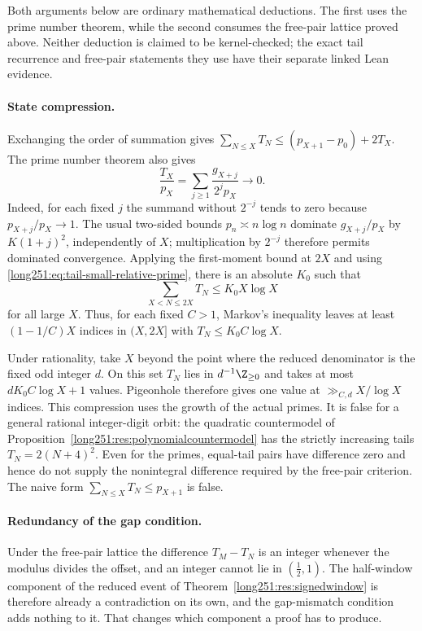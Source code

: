 \documentclass[11pt]{article}
\begin{document}
Both arguments below are ordinary mathematical deductions.  The first uses
the prime number theorem, while the second consumes the free-pair lattice
proved above.  Neither deduction is claimed to be kernel-checked; the exact
tail recurrence and free-pair statements they use have their separate linked
Lean evidence.

\paragraph{State compression.}  Exchanging the order of summation gives
$\sum_{N\le X}T_N\le(p_{X+1}-p_0)+2T_X$.  The prime number theorem
\cite[Ch.~6]{mv2007} also gives
\begin{equation}\label{long251:eq:tail-small-relative-prime}
 \frac{T_X}{p_X}
 =\sum_{j\ge1}\frac{g_{X+j}}{2^jp_X}\longrightarrow0.
\end{equation}
Indeed, for each fixed $j$ the summand without $2^{-j}$ tends to zero because
$p_{X+j}/p_X\to1$.  The usual two-sided bounds $p_n\asymp n\log n$ dominate
$g_{X+j}/p_X$ by $K(1+j)^2$, independently of $X$; multiplication by $2^{-j}$
therefore permits dominated convergence.  Applying the first-moment bound at
$2X$ and using \eqref{long251:eq:tail-small-relative-prime}, there is an absolute
$K_0$ such that
\[
 \sum_{X<N\le2X}T_N\le K_0X\log X
\]
for all large $X$.  Thus, for each fixed $C>1$, Markov's inequality leaves at
least $(1-1/C)X$ indices in $(X,2X]$ with $T_N\le K_0C\log X$.

Under rationality, take $X$ beyond the point where the reduced denominator is
the fixed odd integer $d$.  On this set $T_N$ lies in $d^{-1}\Z_{\ge0}$ and
takes at most $dK_0C\log X+1$ values.  Pigeonhole therefore gives one value at
$\gg_{C,d}X/\log X$ indices.  This compression uses the growth of the actual
primes.  It is false for a general rational integer-digit orbit: the quadratic
countermodel of Proposition~\ref{long251:res:polynomialcountermodel} has the
strictly increasing tails $T_N=2(N+4)^2$.  Even for the primes, equal-tail
pairs have difference zero and hence do not supply the nonintegral difference
required by the free-pair criterion.  The naive form
$\sum_{N\le X}T_N\le p_{X+1}$ is false.

\paragraph{Redundancy of the gap condition.}  Under the free-pair lattice the
difference $T_M-T_N$ is an integer whenever the modulus divides the offset, and
an integer cannot lie in $(\tfrac12,1)$.  The half-window component of the
reduced event of Theorem~\ref{long251:res:signedwindow} is therefore already a
contradiction on its own, and the gap-mismatch condition adds nothing to it.
That changes which component a proof has to produce.
\end{document}
